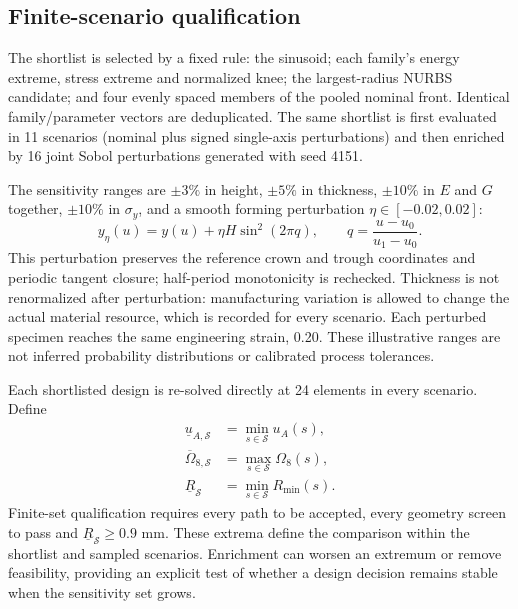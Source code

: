 \documentclass[10pt,twocolumn]{article}
\newcommand{\ua}{u_A}
\newcommand{\om}{\Omega_8}
\begin{document}
\subsection{Finite-scenario qualification}
The shortlist is selected by a fixed rule: the sinusoid; each family's energy extreme, stress extreme and normalized knee; the largest-radius NURBS candidate; and four evenly spaced members of the pooled nominal front. Identical family/parameter vectors are deduplicated. The same shortlist is first evaluated in 11 scenarios (nominal plus signed single-axis perturbations) and then enriched by 16 joint Sobol perturbations generated with seed 4151.

The sensitivity ranges are $\pm3\%$ in height, $\pm5\%$ in thickness, $\pm10\%$ in $E$ and $G$ together, $\pm10\%$ in $\sigma_y$, and a smooth forming perturbation $\eta\in[-0.02,0.02]$:
\begin{equation}
 y_\eta(u)=y(u)+\eta H\sin^2(2\pi q),\qquad
 q=\frac{u-u_0}{u_1-u_0}. \label{eq:perturbation}
\end{equation}
This perturbation preserves the reference crown and trough coordinates and periodic tangent closure; half-period monotonicity is rechecked. Thickness is not renormalized after perturbation: manufacturing variation is allowed to change the actual material resource, which is recorded for every scenario. Each perturbed specimen reaches the same engineering strain, 0.20. These illustrative ranges are not inferred probability distributions or calibrated process tolerances.

Each shortlisted design is re-solved directly at 24 elements in every scenario. Define
\begin{equation}
\begin{aligned}
 \underline{u}_{A,\mathcal S}&=\min_{s\in\mathcal S}\ua(s),\\
 \overline{\Omega}_{8,\mathcal S}&=\max_{s\in\mathcal S}\om(s),\\
 \underline R_{\mathcal S}&=\min_{s\in\mathcal S}R_{\min}(s).
\end{aligned}\label{eq:robust}
\end{equation}
Finite-set qualification requires every path to be accepted, every geometry screen to pass and $\underline R_{\mathcal S}\geq0.9$ mm. These extrema define the comparison within the shortlist and sampled scenarios. Enrichment can worsen an extremum or remove feasibility, providing an explicit test of whether a design decision remains stable when the sensitivity set grows.
\end{document}
